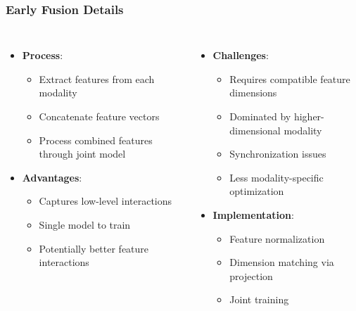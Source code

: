 \documentclass{beamer}
\begin{document}
\begin{frame}
\frametitle{Early Fusion Details}
\begin{columns}
\begin{itemize}
    \item \textbf{Process}:
    \begin{itemize}
        \item Extract features from each modality
        \item Concatenate feature vectors
        \item Process combined features through joint model
    \end{itemize}
    \item \textbf{Advantages}:
    \begin{itemize}
        \item Captures low-level interactions
        \item Single model to train
        \item Potentially better feature interactions
    \end{itemize}
\end{itemize}

\begin{itemize}
    \item \textbf{Challenges}:
    \begin{itemize}
        \item Requires compatible feature dimensions
        \item Dominated by higher-dimensional modality
        \item Synchronization issues
        \item Less modality-specific optimization
    \end{itemize}
    \item \textbf{Implementation}:
    \begin{itemize}
        \item Feature normalization
        \item Dimension matching via projection
        \item Joint training
    \end{itemize}
\end{itemize}
\end{columns}
\end{frame}
\end{document}
